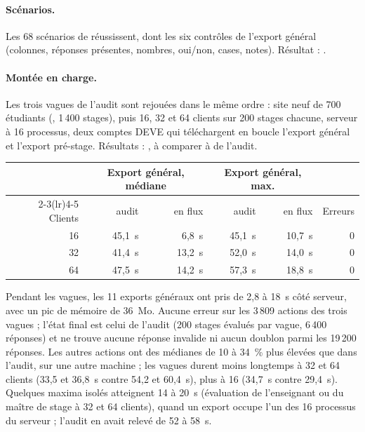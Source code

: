 \documentclass[11pt,a4paper]{article}
\begin{document}
\paragraph{Scénarios.} Les 68 scénarios de  réussissent, dont les six contrôles
de l'export général (colonnes, réponses présentes, nombres, oui/non, cases, notes). Résultat :
.

\paragraph{Montée en charge.} Les trois vagues de l'audit sont rejouées dans le même ordre :
site neuf de 700 étudiants (, 1\,400 stages), puis 16, 32 et 64 clients sur
200 stages chacune, serveur à 16 processus, deux comptes DEVE qui téléchargent en boucle l'export
général et l'export pré-stage. Résultats : , à comparer à
 de l'audit.

\begin{center}
\begin{tabular}{@{}rrrrrr@{}}
  \toprule
  & \multicolumn{2}{c}{Export général, médiane} & \multicolumn{2}{c}{Export général, max.} & \\
  \cmidrule(lr){2-3}\cmidrule(lr){4-5}
  Clients & audit & en flux & audit & en flux & Erreurs \\
  \midrule
  16 & 45,1~s & 6,8~s & 45,1~s & 10,7~s & 0 \\
  32 & 41,4~s & 13,2~s & 52,0~s & 14,0~s & 0 \\
  64 & 47,5~s & 14,2~s & 57,3~s & 18,8~s & 0 \\
  \bottomrule
\end{tabular}
\end{center}

Pendant les vagues, les 11 exports généraux ont pris de 2,8 à 18~s côté serveur, avec un pic de
mémoire de 36~Mo. Aucune erreur sur les 3\,809 actions des trois vagues ; l'état final est celui
de l'audit (200 stages évalués par vague, 6\,400 réponses) et  ne trouve aucune
réponse invalide ni aucun doublon parmi les 19\,200 réponses. Les autres actions ont des médianes
de 10 à 34~\% plus élevées que dans l'audit, sur une autre machine ; les vagues durent moins
longtemps à 32 et 64 clients (33,5 et 36,8~s contre 54,2 et 60,4~s), plus à 16 (34,7~s contre 29,4~s). Quelques maxima isolés atteignent 14 à 20~s (évaluation
de l'enseignant ou du maître de stage à 32 et 64 clients), quand un export occupe l'un des 16
processus du serveur ; l'audit en avait relevé de 52 à 58~s.
\end{document}
